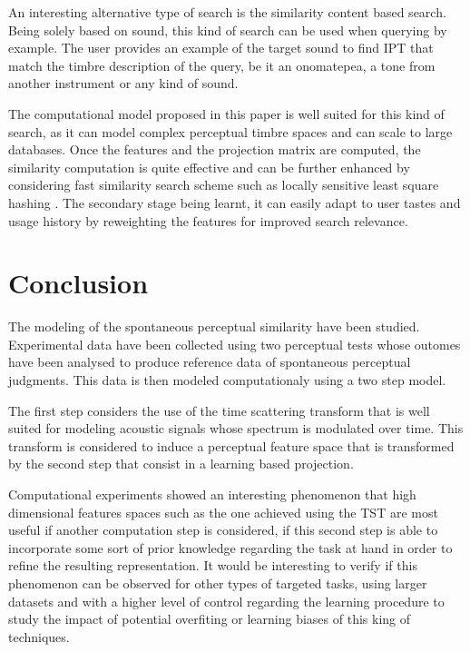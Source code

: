\documentclass{article}
\newcommand{\ipt}{IPT\xspace}
\begin{document}
An interesting alternative type of search is the similarity content based search. Being solely based on sound, this kind of search can be used when querying by example. The user provides an example of the target sound to find \ipt that match the timbre description of the query, be it an onomatepea, a tone from another instrument or any kind of sound.

The computational model proposed in this paper is well suited for this kind of search, as it can model complex perceptual timbre spaces and can scale to large databases. Once the features and the projection matrix are computed, the similarity computation is quite effective and can be further enhanced by considering fast similarity search scheme such as locally sensitive least square hashing \cite{pauleve2010locality}. The secondary stage being learnt, it can easily adapt to user tastes and usage history by reweighting the features for improved search relevance.

\section{Conclusion}

The modeling of the spontaneous perceptual similarity have been studied. Experimental data have been collected using two perceptual tests whose outomes have been analysed to produce reference data of spontaneous perceptual judgments. This data is then modeled computationaly using a two step model.

The first step considers the use of the time scattering transform that is well suited for modeling acoustic signals whose spectrum is modulated over time. This transform is considered to induce a perceptual feature space that is transformed by the second step that consist in a learning based projection.

Computational experiments showed an interesting phenomenon that high dimensional features spaces such as the one achieved using the TST are most useful if another computation step is considered, if this second step is able to incorporate some sort of prior knowledge regarding the task at hand in order to refine the resulting representation. It would be interesting to verify if this phenomenon can be observed for other types of targeted tasks, using larger datasets and with a higher level of control regarding the learning procedure to study the impact of potential overfiting or learning biases of this king of techniques.


\end{document}

